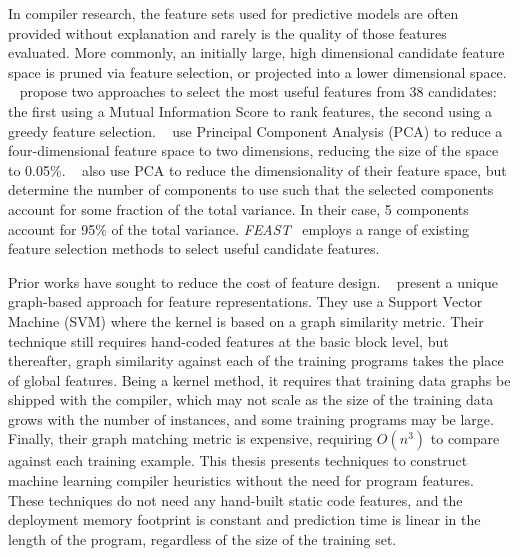 In compiler research, the feature sets used for predictive models are often provided without explanation and rarely is the quality of those features evaluated. More commonly, an initially large, high dimensional candidate feature space is pruned via feature selection, or projected into a lower dimensional space.
\citeauthor{Stephenson2005}~\cite{Stephenson2005} propose two approaches to select the most useful features from 38 candidates: the first using a Mutual Information Score to rank features, the second using a greedy feature selection.
\citeauthor{Collins2013}~\cite{Collins2013} use Principal Component Analysis (PCA) to reduce a four-dimensional feature space to two dimensions, reducing the size of the space to 0.05\%.
\citeauthor{Dubach2007}~\cite{Dubach2007} also use PCA to reduce the dimensionality of their feature space, but determine the number of components to use such that the selected components account for some fraction of the total variance. In their case, 5 components account for 95\% of the total variance.
\emph{FEAST}~\cite{Ting2016} employs a range of existing feature selection methods to select useful candidate features.

Prior works have sought to reduce the cost of feature design.
\citeauthor{Park2012}~\cite{Park2012} present a unique graph-based approach for feature representations. They use a Support Vector Machine (SVM) where the kernel is based on a graph similarity metric. Their technique still requires hand-coded features at the basic block level, but thereafter, graph similarity against each of the training programs takes the place of global features. Being a kernel method, it requires that training data graphs be shipped with the compiler, which may not scale as the size of the training data grows with the number of instances, and some training programs may be large. Finally, their graph matching metric is expensive, requiring $O(n^3)$ to compare against each training example. This thesis presents techniques to construct machine learning compiler heuristics without the need for program features. These techniques do not need any hand-built static code features, and the deployment memory footprint is constant and prediction time is linear in the length of the program, regardless of the size of the training set.

